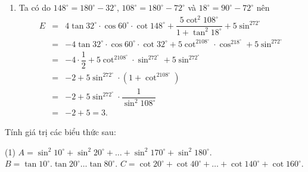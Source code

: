 \begin{bt}
{\begin{enumerate}
	\allowdisplaybreaks
	\begin{eqnarray*}
		D&=& \dfrac{12}{1+\tan^273^\circ} -4\tan 75^\circ\cdot\cot 105^\circ+12\sin^2 107^\circ-2 \tan 40^\circ \cdot \cos 60^\circ \cdot \tan 50^\circ\\
		&=&12\cos^273^\circ-4\tan75^\circ\cdot\cot(180^\circ-75^\circ)+12\sin^2(180^\circ-73^\circ)-2\tan(90^\circ-50)\cos60^\circ\tan 50^\circ\\
		&=&12\cos^273^\circ+4\tan75^\circ\cdot\cot75^\circ+12\sin^273^\circ-2\cot 50^\circ\cdot \tan 50^\circ\cdot \cos 60^\circ\\
		&=&12+4-1=15.
	\end{eqnarray*}
	\item Ta có do $148^\circ=180^\circ-32^\circ$, $108^\circ=180^\circ-72^\circ$ và $18^\circ=90^\circ-72^\circ$ nên
	\allowdisplaybreaks
	\begin{eqnarray*}
		E&=&4 \tan 32^\circ \cdot \cos 60^\circ \cdot \cot 148^\circ+\dfrac{5 \cot^2 108^\circ}{1+\tan^2 18^\circ}+5\sin^272^\circ\\
		&=&-4 \tan 32^\circ \cdot \cos 60^\circ \cdot \cot 32^\circ+5\cot^2108^\circ\cdot\cos^218^\circ+5\sin^272^\circ\\
		&=&-4\cdot\dfrac{1}{2}+5\cot^2108^\circ\cdot\sin^272^\circ+5\sin^272^\circ\\
		&=&-2+5\sin^272^\circ\cdot\left(1+\cot^2108^\circ\right)\\
		&=&-2+5\sin^272^\circ\cdot \dfrac{1}{\sin^2 108^\circ}\\
		&=&-2+5=3.
	\end{eqnarray*}
\end{enumerate}	
}
\end{bt}
\begin{bt}%
	Tính giá trị các biểu thức sau:
	\begin{tasks}(1)
		\task $A=\sin^2 10^{\circ}+\sin^2 20^{\circ}+\dots+\sin^2 170^{\circ}+\sin^2 180^{\circ}$.
		\task $B=\tan 10^{\circ}.\tan 20^{\circ}\dots\tan 80^{\circ}$.
		\task $C=\cot 20^{\circ}+\cot 40^{\circ}+\dots +\cot 140^{\circ}+\cot160^{\circ}$.
	\end{tasks}
\end{bt}
